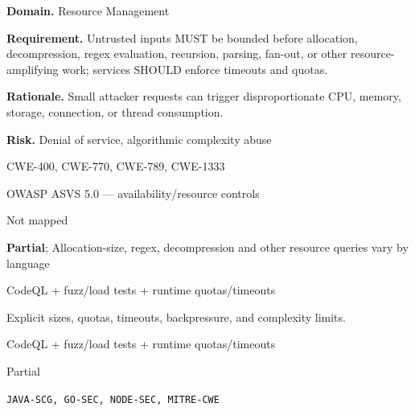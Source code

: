 \documentclass[10pt,letterpaper]{article}
\newcommand{\prioritybadge}[2]{\tcbox[on line,boxrule=0pt,arc=1.2mm,boxsep=0.7mm,left=1mm,right=1mm,top=0.4mm,bottom=0.4mm,colback=#2!12,coltext=#2]{\scriptsize\bfseries #1}}
\begin{document}
\begin{rulebox}[title={\texttt{SCS-ALL-RESOURCE-001} \hfill \prioritybadge{High Priority}{High}}]
\textbf{Domain.} Resource Management

\textbf{Requirement.} Untrusted inputs MUST be bounded before allocation, decompression, regex evaluation, recursion, parsing, fan-out, or other resource-amplifying work; services SHOULD enforce timeouts and quotas.

\textbf{Rationale.} Small attacker requests can trigger disproportionate CPU, memory, storage, connection, or thread consumption.

\textbf{Risk.} Denial of service, algorithmic complexity abuse

\begin{description}[leftmargin=2.65cm,labelwidth=2.3cm,style=nextline,itemsep=1pt,topsep=3pt]
  \item[CWE] CWE-400, CWE-770, CWE-789, CWE-1333
  \item[OWASP] OWASP ASVS 5.0 --- availability/resource controls
  \item[CERT] Not mapped
  \item[CodeQL] \textbf{Partial}; Allocation-size, regex, decompression and other resource queries vary by language
  \item[Enforcement] CodeQL + fuzz/load tests + runtime quotas/timeouts
  \item[Prevention] Explicit sizes, quotas, timeouts, backpressure, and complexity limits.
  \item[Verification] CodeQL + fuzz/load tests + runtime quotas/timeouts
  \item[Automation] Partial
  \item[Sources] \texttt{JAVA-SCG, GO-SEC, NODE-SEC, MITRE-CWE}
\end{description}
\end{rulebox}
\end{document}
